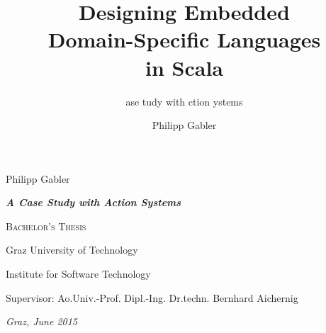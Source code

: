 \documentclass[11pt,a4paper,twoside]{memoir}
\title{Designing Embedded \\ Domain-Specific Languages \\ in Scala}
\subtitle{\upinitial{A}{0pt} \upinitial{C}{-0.8pt}ase %
  \upinitial{S}{-0.8pt}tudy with \upinitial{A}{-0.7pt}ction \upinitial{S}{-1.4pt}ystems}
\author{Philipp Gabler}
\date{}
\newcommand{\upinitial}[2]{{\textup{#1}\kern#2}}
\begin{document}
\pagestyle{simple}
\frontmatter

\begingroup
  \thispagestyle{empty}
  \centering
  \vspace{3cm}
  {\LARGE Philipp Gabler \par}
  \vspace{2cm}
  {\Huge\bfseries \thetitle \par}
  \vspace{0.5cm}
  {\Large\itshape\bfseries \upinitial{A}{0pt} \upinitial{C}{-0.8pt}ase %
    \upinitial{S}{-0.7pt}tudy with \upinitial{A}{-0.6pt}ction \upinitial{S}{-1.4pt}ystems \par}
  \vspace{2.2cm}
  {\Large\scshape Bachelor's Thesis}
  \vfill
  {\large Graz University of Technology \par}
  \vspace{1ex}
  {\large Institute for Software Technology \par}
  \vspace{1cm}
  {Supervisor: Ao.\thinspace{}Univ.-Prof. Dipl.-Ing. Dr.\thinspace{}techn. Bernhard Aichernig \par}
  \vspace{1.1cm}
  {\small\slshape Graz, June 2015 \par}
\endgroup
\end{document}
